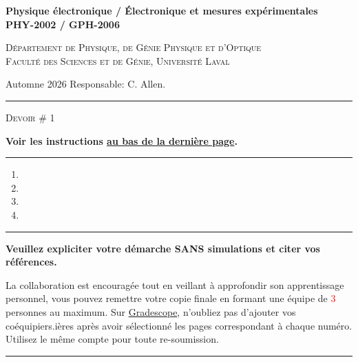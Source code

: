 \documentclass[english,french,12pt]{article}
\begin{document}
\renewcommand{\onlyinsubfile}[1]{}
%
%
\begin{center}
    \textbf{\large{ Physique électronique / Électronique et mesures expérimentales}}\\
    \vspace{0.2em}
    \textbf{PHY-2002 / GPH-2006}\par
    \textsc{Département de Physique, de Génie Physique et d'Optique\\
    Faculté des Sciences et de Génie, Université Laval}
\end{center}
\noindent Automne 2026 \hfill Responsable: C. Allen.
\vspace{0.2em}
\hrule
\vspace{-0.5ex}
\begin{center}
    \textsc{Devoir \# 1}\par
    \small{\textbf{Voir les instructions \hyperref[instructions]{au bas de la dernière page}.}}
\end{center}
\vspace{-1.2ex}
\hrule
\justify
%

\begin{enumerate}[label=\Roman*., itemsep=3ex, wide, labelwidth=!, labelindent=0pt]
    \setcounter{enumi}{0}
    \vspace{3ex}
    \item 
    \vspace{2ex}
    \item 
    \newpage
    \item 
    \item 
\end{enumerate}
 
\vfill
\hrule
\vspace{0.3em}
\centering
\textbf{Veuillez expliciter votre démarche SANS simulations et citer vos références.}\par
\vspace{-0.3em}
La collaboration est encouragée tout en veillant à approfondir son apprentissage personnel, vous pouvez remettre votre copie finale en formant une équipe de \textcolor{red}{3} personnes au maximum. Sur \href{https://www.gradescope.com/}{Gradescope}, n'oubliez pas d'ajouter vos coéquipiers.ières après avoir sélectionné les pages correspondant à chaque numéro. Utilisez le même compte pour toute re-soumission.\par
\vspace{1em}
\hrule
\label{instructions}
\end{document}
